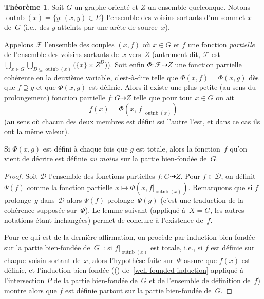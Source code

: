 \documentclass[12pt,a4paper]{article}
\theoremstyle{definition}
\newtheorem{thm}[comcnt]{Théorème}
\newcommand{\outnb}{\operatorname{outnb}}
\begin{document}
\begin{thm}\label{non-well-founded-definition}
Soit $G$ un graphe orienté et $Z$ un ensemble quelconque.
Notons $\outnb(x) = \{y : (x,y) \in E\}$ l'ensemble des
voisins sortants d'un sommet $x$ de $G$ (i.e., des $y$ atteints par une
arête de source $x$).

Appelons $\mathscr{F}$ l'ensemble des couples $(x,f)$ où $x\in G$ et
$f$ une fonction \emph{partielle} de l'ensemble des voisins sortants
de $x$ vers $Z$ (autrement dit, $\mathscr{F}$ est $\bigcup_{x \in G}
\bigcup_{D \subseteq \outnb(x)} \big(\{x\}\times Z^D\big)$).  Soit
enfin $\Phi\colon \mathscr{F} \dasharrow Z$ une fonction partielle
cohérente en la deuxième variable, c'est-à-dire telle que $\Phi(x,f) =
\Phi(x,g)$ dès que $f \supseteq g$ et que $\Phi(x,g)$ est définie.
Alors il existe une plus petite (au sens du prolongement) fonction
partielle $f\colon G \dasharrow Z$ telle que pour tout $x \in G$ on
ait
\[
f(x) = \Phi(x,\, f|_{\outnb(x)})
\]
(au sens où chacun des deux membres est défini ssi l'autre l'est, et
dans ce cas ils ont la même valeur).

Si $\Phi(x,g)$ est défini à chaque fois que $g$ est totale, alors la
fonction $f$ qu'on vient de décrire est définie \emph{au moins} sur la
partie bien-fondée de $G$.
\end{thm}
\begin{proof}
Soit $\mathscr{D}$ l'ensemble des fonctions partielles $f \colon G
\dasharrow Z$.  Pour $f \in \mathscr{D}$, on définit $\Psi(f)$ comme
la fonction partielle $x \mapsto \Phi(x, f|_{\outnb(x)})$.  Remarquons
que si $f$ prolonge $g$ dans $\mathscr{D}$ alors $\Psi(f)$
prolonge $\Psi(g)$ (c'est une traduction de la cohérence supposée
sur $\Phi$).  Le lemme suivant (appliqué à $X=G$, les autres notations
étant inchangées) permet de conclure à l'existence de $f$.

Pour ce qui est de la dernière affirmation, on procède par induction
bien-fondée sur la partie bien-fondée de $G$ : si $f|_{\outnb(x)}$ est
totale, i.e., si $f$ est définie sur chaque voisin sortant de $x$,
alors l'hypothèse faite sur $\Phi$ assure que $f(x)$ est définie, et
l'induction bien-fondée ((\ddag) de \ref{well-founded-induction}
appliqué à l'intersection $P$ de la partie bien-fondée de $G$ et de
l'ensemble de définition de $f$) montre alors que $f$ est définie
partout sur la partie bien-fondée de $G$.
\end{proof}
\end{document}
